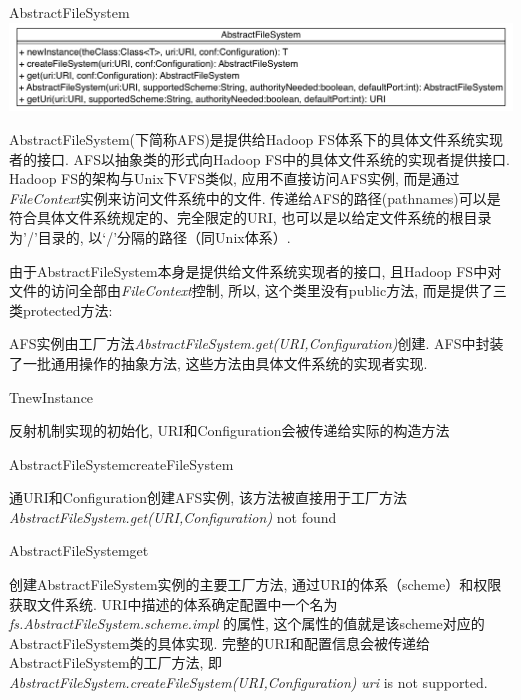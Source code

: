 \begin{XeClass}{AbstractFileSystem}
\includegraphics[width=\textwidth]{cdig/AbstractFileSystem.png}
     
 AbstractFileSystem(下简称AFS)是提供给Hadoop FS体系下的具体文件系统实现者的接口.
 AFS以抽象类的形式向Hadoop FS中的具体文件系统的实现者提供接口.
 Hadoop FS的架构与Unix下VFS类似, 应用不直接访问AFS实例,
 而是通过\emph{FileContext}实例来访问文件系统中的文件.
 传递给AFS的路径(pathnames)可以是符合具体文件系统规定的、完全限定的URI,
 也可以是以给定文件系统的根目录为'/'目录的, 以‘/’分隔的路径（同Unix体系）.
 
 由于AbstractFileSystem本身是提供给文件系统实现者的接口,
 且Hadoop FS中对文件的访问全部由\emph{FileContext}控制, 所以,
 这个类里没有public方法, 而是提供了三类protected方法:
 
 AFS实例由工厂方法\emph{AbstractFileSystem.get(URI,Configuration)}创建.
 AFS中封装了一批通用操作的抽象方法, 这些方法由具体文件系统的实现者实现.

    \begin{XeMethod}{}{T}{newInstance}
         
 反射机制实现的初始化, URI和Configuration会被传递给实际的构造方法

    \end{XeMethod}

    \begin{XeMethod}{\XePrivate}{AbstractFileSystem}{createFileSystem}
         
 通URI和Configuration创建AFS实例,
 该方法被直接用于工厂方法\emph{AbstractFileSystem.get(URI,Configuration)}
 not found

    \end{XeMethod}

    \begin{XeMethod}{}{AbstractFileSystem}{get}
         
 创建AbstractFileSystem实例的主要工厂方法, 通过URI的体系（scheme）和权限获取文件系统.
 URI中描述的体系确定配置中一个名为
 \emph{fs.AbstractFileSystem.scheme.impl}
 的属性, 这个属性的值就是该scheme对应的AbstractFileSystem类的具体实现.
 完整的URI和配置信息会被传递给AbstractFileSystem的工厂方法, 即\emph{AbstractFileSystem.createFileSystem(URI,Configuration)}
 \emph{uri} is not supported.


\end{XeMethod}
\end{XeClass}
